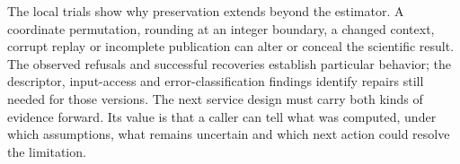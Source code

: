 The local trials show why preservation extends beyond the estimator. A coordinate permutation, rounding at an integer boundary, a changed context, corrupt replay or incomplete publication can alter or conceal the scientific result. The observed refusals and successful recoveries establish particular behavior; the descriptor, input-access and error-classification findings identify repairs still needed for those versions. The next service design must carry both kinds of evidence forward. Its value is that a caller can tell what was computed, under which assumptions, what remains uncertain and which next action could resolve the limitation.

